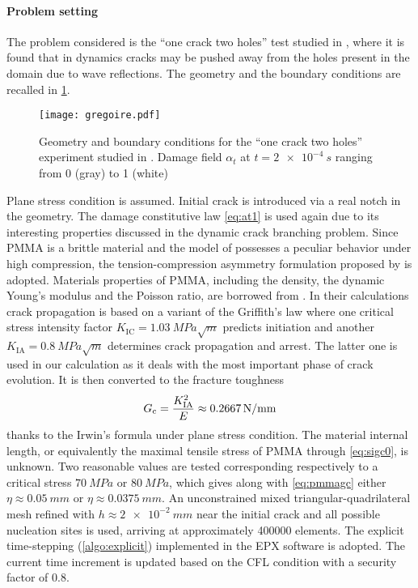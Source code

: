 \paragraph{Problem setting} The problem considered is the ``one crack two holes'' test studied in \cite{HaboussaGregoireElguedjMaigreCombescure:2011}, where it is found that in dynamics cracks may be pushed away from the holes present in the domain due to wave reflections. The geometry and the boundary conditions are recalled in \cref{fig:gregoire}.
\begin{figure}[htbp]
\centering
\texttt{[image: gregoire.pdf]}
\caption{Geometry and boundary conditions for the ``one crack two holes'' experiment studied in \cite{HaboussaGregoireElguedjMaigreCombescure:2011}. Damage field $\alpha_t$ at $t=\SI{2e-4}{s}$ ranging from 0 (gray) to 1 (white)} \label{fig:gregoire}
\end{figure}
Plane stress condition is assumed. Initial crack is introduced via a real notch in the geometry. The damage constitutive law \eqref{eq:at1} is used again due to its interesting properties discussed in the dynamic crack branching problem. Since PMMA is a brittle material \cite{GregoireMaigreRethoreCombescure:2007} and the model of \cite{MieheHofackerWelschinger:2010} possesses a peculiar behavior under high compression, the tension-compression asymmetry formulation proposed by \cite{FreddiRoyer-Carfagni:2010} is adopted. Materials properties of PMMA, including the density, the dynamic Young's modulus and the Poisson ratio, are borrowed from \cite{HaboussaGregoireElguedjMaigreCombescure:2011}. In their calculations crack propagation is based on a variant of the Griffith's law where one critical stress intensity factor $K_\mathrm{IC}=\SI{1.03}{MPa\sqrt{m}}$ predicts initiation and another $K_\mathrm{IA}=\SI{0.8}{MPa\sqrt{m}}$ determines crack propagation and arrest. The latter one is used in our calculation as it deals with the most important phase of crack evolution. It is then converted to the fracture toughness
\begin{equation} \label{eq:pmmagc}
G_\mathrm{c}=\frac{K_\mathrm{IA}^2}{E}\approx\SI{0.2667}{N/mm}
\end{equation}
thanks to the Irwin's formula under plane stress condition. The material internal length, or equivalently the maximal tensile stress of PMMA through \eqref{eq:sigc0}, is unknown. Two reasonable values are tested corresponding respectively to a critical stress $\SI{70}{MPa}$ or $\SI{80}{MPa}$, which gives along with \eqref{eq:pmmagc} either $\eta\approx\SI{0.05}{mm}$ or $\eta\approx\SI{0.0375}{mm}$. An unconstrained mixed triangular-quadrilateral mesh refined with $h\approx\SI{2e-2}{mm}$ near the initial crack and all possible nucleation sites is used, arriving at approximately \num{400000} elements. The explicit time-stepping (\cref{algo:explicit}) implemented in the EPX software is adopted. The current time increment is updated based on the CFL condition with a security factor of 0.8.

